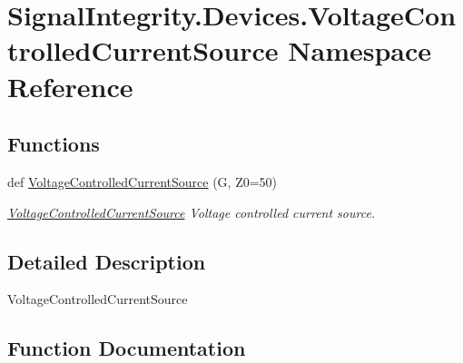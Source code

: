 \hypertarget{namespaceSignalIntegrity_1_1Devices_1_1VoltageControlledCurrentSource}{}\section{Signal\+Integrity.\+Devices.\+Voltage\+Controlled\+Current\+Source Namespace Reference}
\label{namespaceSignalIntegrity_1_1Devices_1_1VoltageControlledCurrentSource}
\subsection*{Functions}
\begin{DoxyCompactItemize}
\item 
def \hyperlink{namespaceSignalIntegrity_1_1Devices_1_1VoltageControlledCurrentSource_a7872e63dc7e9edba813db528501f0a10}{Voltage\+Controlled\+Current\+Source} (G, Z0=50)
\begin{DoxyCompactList}\small\item\em \hyperlink{namespaceSignalIntegrity_1_1Devices_1_1VoltageControlledCurrentSource}{Voltage\+Controlled\+Current\+Source} Voltage controlled current source. \end{DoxyCompactList}\end{DoxyCompactItemize}


\subsection{Detailed Description}
\begin{DoxyVerb}VoltageControlledCurrentSource\end{DoxyVerb}
 

\subsection{Function Documentation}
\mbox{\label{namespaceSignalIntegrity_1_1Devices_1_1VoltageControlledCurrentSource_a7872e63dc7e9edba813db528501f0a10}} 
